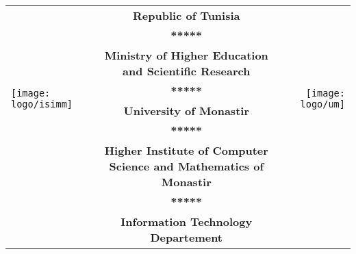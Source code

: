 \begin{titlepage}
    \begin{center}
        \renewcommand\arraystretch{1}
        \fontsize{9}{0.9\baselineskip}\selectfont
        \begin{tabular}{ l c r }
            \multirow[c]{7}{*}{\texttt{[image: logo/isimm]}} & \textbf{Republic of Tunisia}                                              & \multirow[c]{7}{*}{\texttt{[image: logo/um]}} \\
                                                                         & \textbf{*****}                                                                                                                                     \\
                                                                         & \textbf{Ministry of Higher Education and Scientific Research}                                                                                      \\
                                                                         & \textbf{*****}                                                                                                                                     \\
                                                                         & \textbf{University of Monastir}                                                                                                                    \\
                                                                         & \textbf{*****}                                                                                                                                     \\
                                                                         & \textbf{Higher Institute of Computer Science and Mathematics of Monastir}                                                                          \\
                                                                         & \textbf{*****}                                                                                                                                     \\
                                                                         & \textbf{Information Technology Departement}                                                                                                        \\
        \end{tabular}


\end{center}
\end{titlepage}
